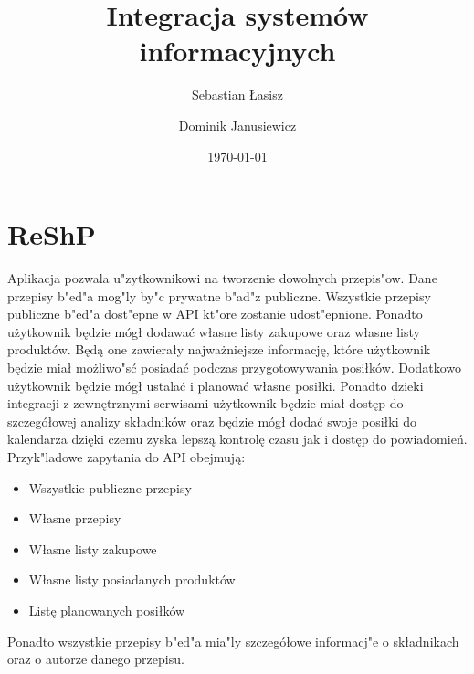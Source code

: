 \documentclass{article}
\title{Integracja systemów informacyjnych}
\author{
	Sebastian Łasisz
	\and
	Dominik Janusiewicz}
\date{\today}
\begin{document}
\maketitle

\section{ReShP}
	Aplikacja pozwala u"zytkownikowi na tworzenie dowolnych przepis"ow. Dane przepisy b"ed"a mog"ly by"c prywatne b"ad"z publiczne. Wszystkie przepisy publiczne b"ed"a dost"epne w API kt"ore zostanie udost"epnione. Ponadto użytkownik będzie mógł dodawać własne listy zakupowe oraz własne listy produktów. Będą one zawierały najważniejsze informację, które użytkownik będzie miał możliwo"sć posiadać podczas przygotowywania posiłków. Dodatkowo użytkownik będzie mógł ustalać i planować własne posiłki. Ponadto dzieki integracji z zewnętrznymi serwisami użytkownik będzie miał dostęp do szczegółowej analizy składników oraz będzie mógł dodać swoje posiłki do kalendarza dzięki czemu zyska lepszą kontrolę czasu jak i dostęp do powiadomień. Przyk"ladowe zapytania do API obejmują:
	\begin{itemize}
		\item Wszystkie publiczne  przepisy
		\item Własne przepisy
		\item Własne listy zakupowe
		\item Własne listy posiadanych produktów
		\item Listę planowanych posiłków
	\end{itemize}
	Ponadto wszystkie przepisy b"ed"a mia"ly szczegółowe informacj"e o składnikach oraz o autorze danego przepisu.
\end{document}
